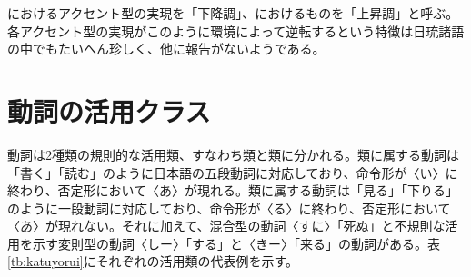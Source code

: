 \LLast[]におけるアクセント型の実現を「下降調」、\Last[]におけるものを「上昇調」と呼ぶ。各アクセント型の実現がこのように環境によって逆転するという特徴は日琉諸語の中でもたいへん珍しく、他に報告がないようである。

\section{動詞の活用クラス}

動詞は2種類の規則的な活用類、すなわち類と類に分かれる。類に属する動詞は「書く」「読む」のように日本語の五段動詞に対応しており、命令形が〈い〉に終わり、否定形において〈あ〉が現れる。類に属する動詞は「見る」「下りる」のように一段動詞に対応しており、命令形が〈る〉に終わり、否定形において〈あ〉が現れない。それに加えて、混合型の動詞〈すに〉「死ぬ」と不規則な活用を示す変則型の動詞〈しー〉「する」と〈きー〉「来る」の動詞がある。表\ref{tb:katuyorui}にそれぞれの活用類の代表例を示す。

